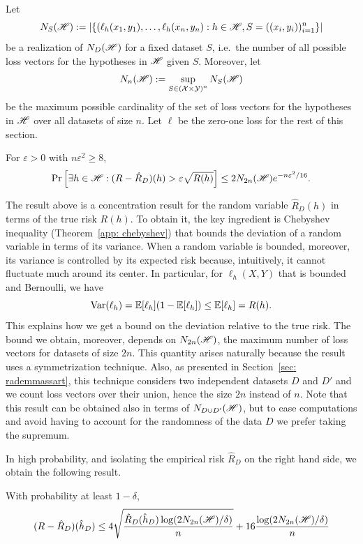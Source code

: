 \documentclass[reqno]{amsart}
\begin{document}
Let \[N_S(\mathscr{H}) := \left\vert\{(\ell_h(x_1,y_1),\ldots,\ell_h(x_n,y_n):h\in\mathscr{H}, S = ((x_i,y_i))_{i=1}^n\}\right\vert\] be a realization of $N_D(\mathscr{H})$ for a fixed dataset $S$, i.e.\ the number of all possible loss vectors for the hypotheses in $\mathscr{H}$ given $S$. Moreover, let \[N_{n}(\mathscr{H}) := \sup_{S \in {(\mathcal{X}\times \mathcal{Y})}^n} N_S(\mathscr{H})\] be the maximum possible cardinality of the set of loss vectors for the hypotheses in $\mathscr{H}$ over all datasets of size $n$. Let $\ell$ be the zero-one loss for the rest of this section.

\begin{lemma}\label{lemma: rel dev}
  For $\varepsilon>0$ with $n\varepsilon^2 \ge 8$,
  \[
  \Pr\left[\exists h\in\mathscr{H} : (R-\hat R_D)(h) > \varepsilon\sqrt{R(h)}\right] \le 2N_{2n}(\mathscr{H})e^{-n\varepsilon^2/16}.
  \]
\end{lemma}

The result above is a concentration result for the random variable $\hat R_D (h)$ in terms of the true risk $R(h)$. To obtain it, the key ingredient is Chebyshev inequality (Theorem~\ref{app: chebyshev}) that bounds the deviation of a random variable in terms of its variance. When a random variable is bounded, moreover, its variance is controlled by its expected risk because, intuitively, it cannot fluctuate much around its center. In particular, for $\ell_h(X,Y)$ that is bounded and Bernoulli, we have
\[
\operatorname{Var}(\ell_h) = \mathbb{E}[\ell_h](1-\mathbb{E}[\ell_h])\le \mathbb{E}[\ell_h] = R(h).
\]
This explains how we get a bound on the deviation relative to the true risk. 
The bound we obtain, moreover, depends on $N_{2n}(\mathscr{H})$, the maximum number of loss vectors for datasets of size $2n$. This quantity arises naturally because the result uses a symmetrization technique. Also, as presented in Section~\ref{sec: rademmassart}, this technique considers two independent datasets $D$ and $D'$ and we count loss vectors over their union, hence the size $2n$ instead of $n$. Note that this result can be obtained also in terms of $N_{D\cup D'}(\mathscr{H})$, but to ease computations and avoid having to account for the randomness of the data $D$ we prefer taking the supremum.

In high probability, and isolating the empirical risk $\hat R_D$ on the right hand side, we obtain the following result. 

\begin{theorem}\label{thm: bound emprisk}
    With probability at least $1-\delta$,
    \[
    (R - \hat R_D)(\hat h_D) \le 4\sqrt{\frac{\hat R_D(\hat h_D)\log(2N_{2n}(\mathscr{H})/\delta)}{n}} + 16\frac{\log(2N_{2n}(\mathscr{H})/\delta)}{n}
    \]
\end{theorem}
\end{document}
